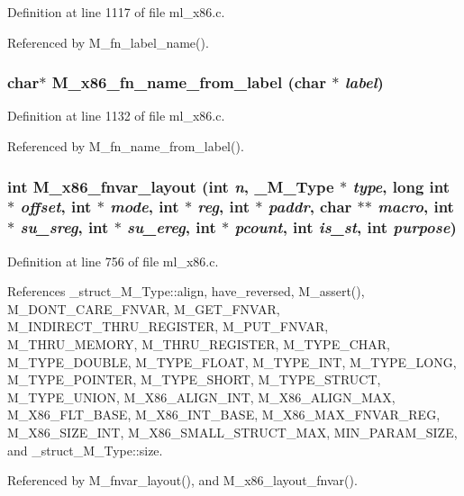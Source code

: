 Definition at line 1117 of file ml\_\-x86.c.

Referenced by M\_\-fn\_\-label\_\-name().
\subsubsection{\setlength{\rightskip}{0pt plus 5cm}char$\ast$ M\_\-x86\_\-fn\_\-name\_\-from\_\-label (char $\ast$ {\em label})}\label{m__x86_8h_ae7aef017d8df0e478a8ee19fab633ff}




Definition at line 1132 of file ml\_\-x86.c.

Referenced by M\_\-fn\_\-name\_\-from\_\-label().
\subsubsection{\setlength{\rightskip}{0pt plus 5cm}int M\_\-x86\_\-fnvar\_\-layout (int {\em n}, \bf{\_\-M\_\-Type} $\ast$ {\em type}, long int $\ast$ {\em offset}, int $\ast$ {\em mode}, int $\ast$ {\em reg}, int $\ast$ {\em paddr}, char $\ast$$\ast$ {\em macro}, int $\ast$ {\em su\_\-sreg}, int $\ast$ {\em su\_\-ereg}, int $\ast$ {\em pcount}, int {\em is\_\-st}, int {\em purpose})}\label{m__x86_8h_f19e38bfc5705e30e3dbb4a8ce7c8175}




Definition at line 756 of file ml\_\-x86.c.

References \_\-struct\_\-M\_\-Type::align, have\_\-reversed, M\_\-assert(), M\_\-DONT\_\-CARE\_\-FNVAR, M\_\-GET\_\-FNVAR, M\_\-INDIRECT\_\-THRU\_\-REGISTER, M\_\-PUT\_\-FNVAR, M\_\-THRU\_\-MEMORY, M\_\-THRU\_\-REGISTER, M\_\-TYPE\_\-CHAR, M\_\-TYPE\_\-DOUBLE, M\_\-TYPE\_\-FLOAT, M\_\-TYPE\_\-INT, M\_\-TYPE\_\-LONG, M\_\-TYPE\_\-POINTER, M\_\-TYPE\_\-SHORT, M\_\-TYPE\_\-STRUCT, M\_\-TYPE\_\-UNION, M\_\-X86\_\-ALIGN\_\-INT, M\_\-X86\_\-ALIGN\_\-MAX, M\_\-X86\_\-FLT\_\-BASE, M\_\-X86\_\-INT\_\-BASE, M\_\-X86\_\-MAX\_\-FNVAR\_\-REG, M\_\-X86\_\-SIZE\_\-INT, M\_\-X86\_\-SMALL\_\-STRUCT\_\-MAX, MIN\_\-PARAM\_\-SIZE, and \_\-struct\_\-M\_\-Type::size.

Referenced by M\_\-fnvar\_\-layout(), and M\_\-x86\_\-layout\_\-fnvar().
